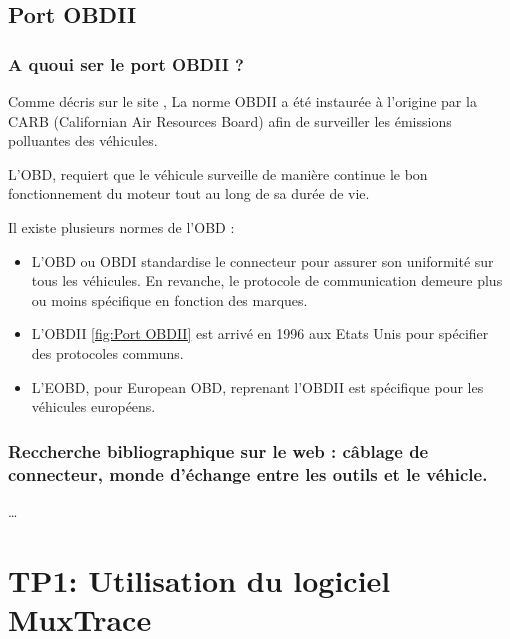 \documentclass{rapportECC}
\begin{document}
\subsection{Port OBDII}

\subsubsection*{A quoui ser le port OBDII ?}

Comme décris sur le site \cite{klavkarr}, La norme OBDII a été instaurée à l'origine par la CARB (Californian Air Resources Board) afin de surveiller les émissions polluantes des véhicules.  

L'OBD, requiert que le véhicule surveille de manière continue le bon fonctionnement du moteur tout au long de sa durée de vie.

Il existe plusieurs normes de l'OBD : 
\begin{itemize}
    \item L'OBD ou OBDI standardise le connecteur pour assurer son uniformité sur tous les véhicules. En revanche, le protocole de communication demeure plus ou moins spécifique en fonction des marques.
    \item L'OBDII \ref{fig:Port OBDII} est arrivé en 1996 aux Etats Unis pour spécifier des protocoles communs.
    \item L'EOBD, pour European OBD, reprenant l'OBDII est spécifique pour les véhicules européens.
\end{itemize}
    
\subsubsection*{Reccherche bibliographique sur le web : câblage de connecteur, monde d'échange entre les outils et le véhicle.}

\dots


\section{TP1: Utilisation du logiciel MuxTrace}

\end{document}
